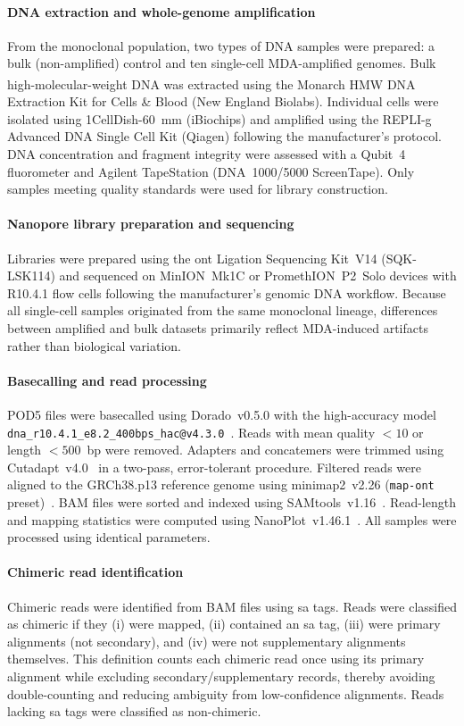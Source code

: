 \documentclass[pdflatex,lineno]{sn-jnl}%
\begin{document}
\paragraph{DNA extraction and whole-genome amplification}
From the monoclonal population, two types of DNA samples were prepared: a bulk (non-amplified) control and ten single-cell MDA-amplified genomes. Bulk high-molecular-weight DNA was extracted using the Monarch\textsuperscript{\textregistered} HMW DNA Extraction Kit for Cells \& Blood (New England Biolabs). Individual cells were isolated using 1CellDish-60~mm (iBiochips) and amplified using the REPLI-g Advanced DNA Single Cell Kit (Qiagen) following the manufacturer's protocol. DNA concentration and fragment integrity were assessed with a Qubit~4 fluorometer and Agilent TapeStation (DNA~1000/5000 ScreenTape). Only samples meeting quality standards were used for library construction.

\paragraph{Nanopore library preparation and sequencing}
Libraries were prepared using the \gls{ont} Ligation Sequencing Kit~V14 (SQK-LSK114) and sequenced on MinION~Mk1C or PromethION~P2~Solo devices with R10.4.1 flow cells following the manufacturer’s genomic DNA workflow. Because all single-cell samples originated from the same monoclonal lineage, differences between amplified and bulk datasets primarily reflect MDA-induced artifacts rather than biological variation.

\paragraph{Basecalling and read processing}
POD5 files were basecalled using Dorado~v0.5.0 with the high-accuracy model \texttt{dna\_r10.4.1\_e8.2\_400bps\_hac@v4.3.0}~\cite{dorado2023}. Reads with mean quality $<10$ or length $<500$~bp were removed. Adapters and concatemers were trimmed using Cutadapt~v4.0~\cite{martin2011cutadapt} in a two-pass, error-tolerant procedure. Filtered reads were aligned to the GRCh38.p13 reference genome using minimap2~v2.26 (\texttt{map-ont} preset)~\cite{li2018minimap2}. BAM files were sorted and indexed using SAMtools~v1.16~\cite{danecek2021twelve}. Read-length and mapping statistics were computed using NanoPlot~v1.46.1~\cite{decoster2023nanopack2}. All samples were processed using identical parameters.

\paragraph{Chimeric read identification}
Chimeric reads were identified from BAM files using \gls{sa} tags.
Reads were classified as chimeric if they (i) were mapped, (ii) contained an \gls{sa} tag, (iii) were primary alignments (not secondary), and (iv) were not supplementary alignments themselves.
This definition counts each chimeric read once using its primary alignment while excluding secondary/supplementary records, thereby avoiding double-counting and reducing ambiguity from low-confidence alignments. Reads lacking \gls{sa} tags were classified as non-chimeric.
\end{document}
